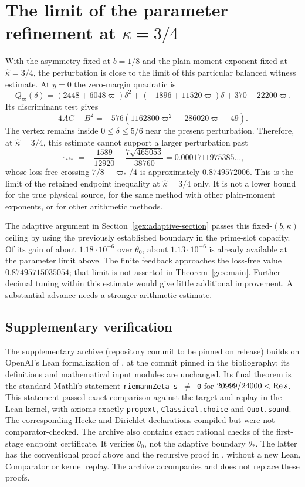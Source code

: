 \section{The limit of the parameter refinement at
\texorpdfstring{$\kappa=3/4$}{kappa=3/4}}\label{gex:limit-section}

With the asymmetry fixed at $b=1/8$ and the plain-moment exponent
fixed at $\widehat\kappa=3/4$, the
perturbation is close to the limit of this particular balanced
witness estimate. At $y=0$ the zero-margin quadratic is
\[
 Q_\varpi(\delta)=(2448+6048\varpi)\delta^2+
              (-1896+11520\varpi)\delta+370-22200\varpi.
\]
Its discriminant test gives
\[
 4AC-B^2=-576(1162800\varpi^2+286020\varpi-49).
\]
The vertex remains inside $0\le\delta\le5/6$ near the present
perturbation. Therefore, at $\widehat\kappa=3/4$, this estimate cannot
support a larger perturbation past
\[
 \varpi_*=-\frac{1589}{12920}+\frac{7\sqrt{465053}}{38760}
       =0.0001711975385\ldots,
\]
whose loss-free crossing $7/8-\varpi_*/4$ is approximately
$0.8749572006$. This is the limit of the retained endpoint inequality
at $\widehat\kappa=3/4$ only. It is not a lower bound for the true
physical source, for the same method with other plain-moment
exponents, or for other arithmetic methods.

The adaptive argument in Section~\ref{gex:adaptive-section} passes this
fixed-$(b,\kappa)$ ceiling by using the previously established boundary
in the prime-slot capacity. Of its gain of about $1.18\cdot10^{-6}$
over $\theta_0$, about $1.13\cdot10^{-6}$ is already available at the
parameter limit above. The finite feedback approaches the loss-free
value $0.87495715035054$; that limit is not asserted in
Theorem~\ref{gex:main}. Further decimal tuning within this estimate
would give little additional improvement. A substantial advance needs
a stronger arithmetic estimate.

\subsection*{Supplementary verification}

The supplementary archive (repository commit to be pinned on release)
builds on OpenAI's Lean formalization of \cite{OAI26}, at the commit
pinned in the bibliography; its definitions and mathematical input
modules are unchanged. Its final theorem is the standard Mathlib
statement \mbox{\texttt{riemannZeta s $\ne$ 0}} for
$20999/24000<\operatorname{Re} s$. This statement passed exact comparison against
the target and replay in the Lean kernel, with axioms exactly
\texttt{propext}, \texttt{Classical.choice} and \texttt{Quot.sound}.
The corresponding Hecke and Dirichlet declarations compiled but were
not comparator-checked. The archive also contains exact rational checks
of the first-stage endpoint certificate. It verifies $\theta_0$, not
the adaptive boundary $\theta_*$. The latter has the conventional
proof above and the recursive proof in \cite{GaoAdaptive26}, without
a new Lean, Comparator or kernel replay. The archive accompanies
and does not replace these proofs.

